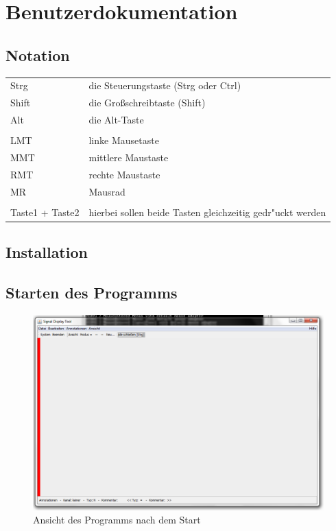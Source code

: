 \chapter{Benutzerdokumentation}


\section{Notation}

\begin{tabular}{l|l}
	Strg & die Steuerungstaste (Strg oder Ctrl) \\
	Shift & die Gro\ss schreibtaste (Shift) \\
	Alt & die Alt-Taste \\
	\\
	LMT & linke Mausetaste \\
	MMT & mittlere Maustaste \\
	RMT & rechte Maustaste \\
	MR & Mausrad\\
	\\
	Taste1 + Taste2 & hierbei sollen beide Tasten gleichzeitig gedr"uckt werden \\
\end{tabular}

\section{Installation}



\section{Starten des Programms}

\begin{figure}[htb]
\centering
\includegraphics[width=\textwidth]{bilder/window.png}
\caption{Ansicht des Programms nach dem Start}
\label{pic:program_start}
\end{figure}

